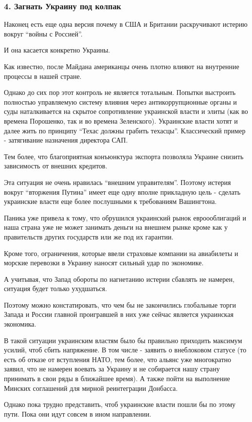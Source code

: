  
 
 
 
 

\subsubsection{4. Загнать Украину под колпак}

Наконец есть еще одна версия почему в США и Британии раскручивают истерию
вокруг \enquote{войны с Россией}.

И она касается конкретно Украины.

Как известно, после Майдана американцы очень плотно влияют на внутренние
процессы в нашей стране.

Однако до сих пор этот контроль не является тотальным. Попытки выстроить
полностью управляемую систему влияния через антикоррупционные органы и суды
наталкивается на скрытое сопротивление украинской власти и элиты (как во
времена Порошенко, так и во времена Зеленского). Украинские власти хотят и
далее жить по принципу \enquote{Техас должны грабить техасцы}. Классический пример -
затягивание назначения директора САП.

Тем более, что благоприятная конъюнктура экспорта позволяла Украине снизить
зависимость от внешних кредитов. 

Эта ситуация не очень нравилась \enquote{внешним управителям}. Поэтому истерия вокруг
\enquote{вторжения Путина} имеет еще одну вполне прикладную цель - сделать украинские
власти еще более послушными к требованиям Вашингтона. 

Паника уже привела к тому, что обрушился украинский рынок евроооблигаций и наша
страна уже не может занимать деньги на внешнем рынке кроме как у правительств
других государств или же под их гарантии. 

Кроме того, ограничения, которые ввели страховые компании на авиабилеты и
морские перевозки в Украину наносят сильный удар по экономике. 

А учитывая, что Запад обороты по нагнетанию истерии сбавлять не намерен,
ситуация будет только ухудшаться.

Поэтому можно констатировать, что чем бы не закончились глобальные торги Запада
и России главной проигравшей в них уже сейчас является украинская экономика.

В такой ситуации украинским властям было бы правильно приходить максимум
усилий, чтоб сбить напряжение. В том числе - заявить о внеблоковом статусе (то
есть об отказе от вступления НАТО, тем более, что альянс уже многократно
заявил, что не намерен воевать за Украину и не собирается нашу страну принимать
в свои ряды в ближайшее время). А также пойти на выполнение Минских соглашений
для мирной реинтеграции Донбасса.

Однако пока трудно представить, чтоб украинские власти пошли бы по этому пути.
Пока они идут совсем в ином направлении. 


